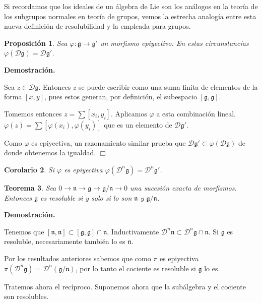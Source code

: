 \documentclass[a4paper,draft,12pt]{article}
\newtheorem{teo}{Teorema}[section]%
\newtheorem{propo}[teo]{Proposición}%
\newtheorem{cor}[teo]{Corolario}%
\newcommand{\dem}{\noindent \textbf{Demostración. }\vspace{0.3 cm}}%
\newcommand{\g}{\mathfrak{g}}%
\newcommand{\fin}{ $\Box $ \vspace{0.4 cm}}
\newcommand{\D}{\mathcal{D}}%
\begin{document}
Si recordamos que los ideales de un álgebra de Lie son los análogos en la teoría de los subgrupos normales en teoría de grupos, vemos la estrecha analogía entre esta nueva definición de resolubilidad y la empleada para grupos.


\begin{propo}

Sea $\varphi: \g \rightarrow \g'$ un morfismo epiyectivo.  En estas circunstancias $\varphi(\D\g)=\D\g'$.

\end{propo}


\dem

Sea $z \in \D\g$.  Entonces $z$ se puede escribir como una suma finita de elementos de la forma $[x,y]$, pues estos generan, por definición, el subespacio $[\g,\g]$.

Tomemos entonces $z = \sum [x_i,y_i]$.  Aplicamos $\varphi$ a esta combinación lineal. $\varphi(z) = \sum [\varphi(x_i),\varphi(y_i)]$ que es un elemento de $\D \g'$.

Como $\varphi$ es epiyectiva, un razonamiento similar prueba que $\D\g' \subset \varphi(\D\g)$ de donde obtenemos la igualdad.  \fin

\begin{cor}

Si $\varphi$ es epiyectiva $\varphi(\D^n\g) = \D^n\g'$.

\end{cor}

\begin{teo}

Sea $0 \rightarrow \mathfrak{n} \rightarrow \g \rightarrow \g/\mathfrak{n}\rightarrow 0 $ una sucesión exacta de morfismos.  Entonces $\g$ es resoluble si y solo si lo son $\mathfrak{n}$ y $\g/\mathfrak{n}$.

\end{teo}


\dem

Tenemos que $[\mathfrak{n},\mathfrak{n}]\subset [\g,\g]\cap \mathfrak{n}$. Inductivamente $\D^n\mathfrak{n}\subset \D^n \g \cap \mathfrak{n}$.  Si $\g$ es resoluble, necesariamente  también lo es $\mathfrak{n}$.

Por los resultados anteriores sabemos que como $\pi$ es epiyectiva $\pi(\D^n\g) = \D^n(\g/\mathfrak{n})$, por lo tanto el cociente es resoluble si $\g$ lo es.

\bigskip

Tratemos ahora el recíproco.  Suponemos ahora que la subálgebra y el cociente son resolubles.
\end{document}
